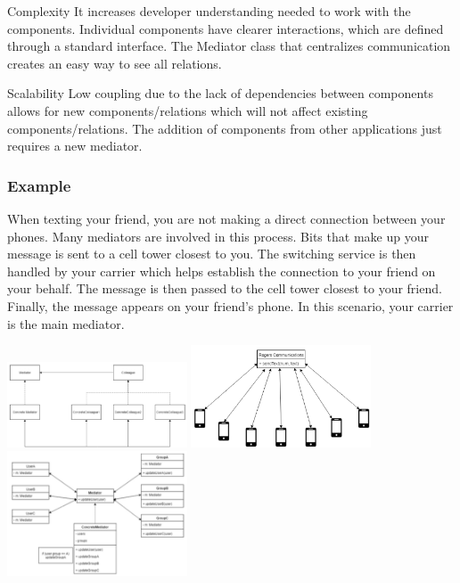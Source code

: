 \begin{nfps}
\item[Complexity] It increases developer understanding needed to work with
    the components. Individual components have clearer interactions, which are
    defined through a standard interface. The {\sc Mediator} class that
    centralizes communication creates an easy way to see all relations.
\item[Scalability] Low coupling due to the lack of dependencies between
    components allows for new components/relations which will not affect
    existing components/relations. The addition of components from other
    applications just requires a new mediator. 
\end{nfps}

\subsubsection{Example}
When texting your friend, you are not making a direct connection between your
phones. Many mediators are involved in this process. Bits that make up your
message is sent to a cell tower closest to you. The switching service is then
handled by your carrier which helps establish the connection to your friend on
your behalf. The message is then passed to the cell tower closest to your
friend. Finally, the message appears on your friend’s phone. In this scenario,
your carrier is the main mediator.

\begin{center}
    \includegraphics[width=0.4\textwidth]{./mediator1}
    \includegraphics[width=0.4\textwidth]{./mediator2}
    \includegraphics[width=0.4\textwidth]{./mediator3}
\end{center}
